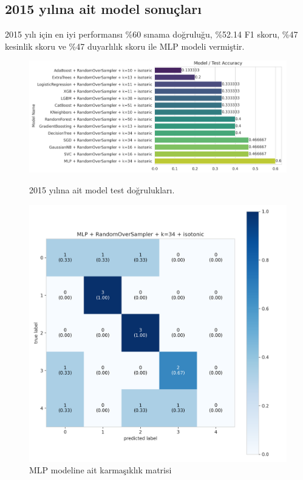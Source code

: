 \newpage

\subsection{2015 yılına ait model sonuçları}
2015 yılı için en iyi performansı \%60 sınama doğruluğu,  \%52.14 F1 skoru, \%47 kesinlik skoru ve \%47 duyarlılık skoru ile MLP modeli vermiştir.

\begin{figure}[ht]
\centering
\begin{minipage}[b]{0.6\textwidth}
    \centering
    \includegraphics[width=\textwidth]{2015.png}
    \caption{2015 yılına ait model test doğrulukları.}
    \label{fig:resim1}
\end{minipage}
\hfill
\begin{minipage}[b]{0.6\textwidth}
    \centering
    \includegraphics[width=\textwidth]{2015_cm.png}
    \caption{MLP modeline ait karmaşıklık matrisi}
    \label{fig:resim2}
\end{minipage}
\end{figure}

